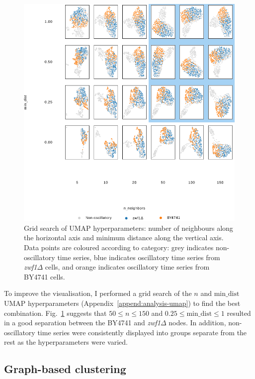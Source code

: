 \begin{figure}
  \centering
    \includegraphics[width=0.9\linewidth]{umap_grid_is20016_edit3.png}
    \caption[
      Grid search of UMAP hyperparameters.
    ]{
      Grid search of UMAP hyperparameters: number of neighbours along the horizontal axis and minimum distance along the vertical axis.
      Data points are coloured according to category: grey indicates non-oscillatory time series, blue indicates oscillatory time series from \textit{zwf1$\Delta$} cells, and orange indicates oscillatory time series from BY4741 cells.
    }
  \label{fig:umap-gridsearch}
\end{figure}

To improve the visualisation, I performed a grid search of the $n$ and $\mathrm{min\_dist}$ UMAP hyperparameters (Appendix~\ref{append:analysis-umap}) to find the best combination.
Fig.\ \ref{fig:umap-gridsearch} suggests that $50 \leq n \leq 150$ and $0.25 \leq \mathrm{min\_dist} \leq 1$ resulted in a good separation between the BY4741 and \textit{zwf1$\Delta$} nodes.
In addition, non-oscillatory time series were consistently displayed into groups separate from the rest as the hyperparameters were varied.


\subsection{Graph-based clustering}
\label{subsec:analysis-clustering-graphclustering}

